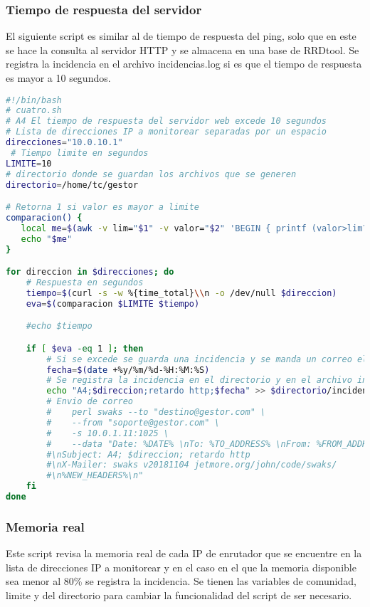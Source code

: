 \documentclass[a4paper,12pt]{article}
\begin{document}
\subsubsection{Tiempo de respuesta del servidor}
El siguiente script es similar al de tiempo de respuesta del ping, solo que en este se hace la consulta al servidor HTTP y se almacena en una base de RRDtool. Se registra la incidencia en el archivo incidencias.log si es que el tiempo de respuesta es mayor a 10 segundos.
\begin{lstlisting}[language=bash]
 #!/bin/bash
# cuatro.sh
# A4 El tiempo de respuesta del servidor web excede 10 segundos
# Lista de direcciones IP a monitorear separadas por un espacio
direcciones="10.0.10.1"
 # Tiempo limite en segundos
LIMITE=10
# directorio donde se guardan los archivos que se generen
directorio=/home/tc/gestor

# Retorna 1 si valor es mayor a limite
comparacion() {
   local me=$(awk -v lim="$1" -v valor="$2" 'BEGIN { printf (valor>lim?1:0) }')
   echo "$me"
}

for direccion in $direcciones; do
    # Respuesta en segundos
    tiempo=$(curl -s -w %{time_total}\\n -o /dev/null $direccion)
    eva=$(comparacion $LIMITE $tiempo)

    #echo $tiempo

    if [ $eva -eq 1 ]; then
        # Si se excede se guarda una incidencia y se manda un correo electronico
        fecha=$(date +%y/%m/%d-%H:%M:%S)
        # Se registra la incidencia en el directorio y en el archivo incidencias
        echo "A4;$direccion;retardo http;$fecha" >> $directorio/incidencias.log
        # Envio de correo
        #    perl swaks --to "destino@gestor.com" \
        #    --from "soporte@gestor.com" \
        #    -s 10.0.1.11:1025 \
        #    --data "Date: %DATE% \nTo: %TO_ADDRESS% \nFrom: %FROM_ADDRESS% 
        #\nSubject: A4; $direccion; retardo http 
        #\nX-Mailer: swaks v20181104 jetmore.org/john/code/swaks/
        #\n%NEW_HEADERS%\n"
    fi
done

\end{lstlisting}

\subsubsection{Memoria real}
Este script revisa la memoria real de cada IP de enrutador que se encuentre en la lista de direcciones IP a monitorear y en el caso en el que la memoria disponible sea menor al 80\% se registra la incidencia. Se tienen las variables de comunidad, limite y del directorio para cambiar la funcionalidad del script de ser necesario.
\end{document}
